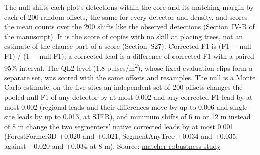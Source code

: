 \documentclass[10pt]{article}
\begin{document}
The null shifts each plot's detections within the core and its matching margin
by each of 200 random offsets, the same for every detector and density, and
scores the mean counts over the 200 shifts like the observed detections (Section~IV-B of the manuscript). It is the score of copies with no skill at placing
trees, not an estimate of the chance part of a score (Section~S27). Corrected F1
is (F1 $-$ null F1) / (1 $-$ null F1); a corrected lead is a difference of corrected
F1 with a paired 95\% interval. The QL2 level (1.8 pulses/m\textsuperscript{2}), whose fixed
evaluation clips form a separate set, was scored with the same offsets and
resamples. The null is a Monte Carlo estimate: on the five sites an independent
set of 200 offsets changes the pooled null F1 of any detector by at most 0.002
and any corrected F1 lead by at most 0.002 (regional leads and their differences
move by up to 0.006 and single-site leads by up to 0.013, at SJER), and minimum
shifts of 6 m or 12 m instead of 8 m change the two segmenters' native corrected
leads by at most 0.001 (ForestFormer3D +0.020 and +0.021, SegmentAnyTree +0.034
and +0.035, against +0.020 and +0.034 at 8 m). Source: \href{https://github.com/devakellc/lidar-tree-benchmark/blob/main/results/matcher-robustness-results.md}{matcher-robustness
study}.
\end{document}
